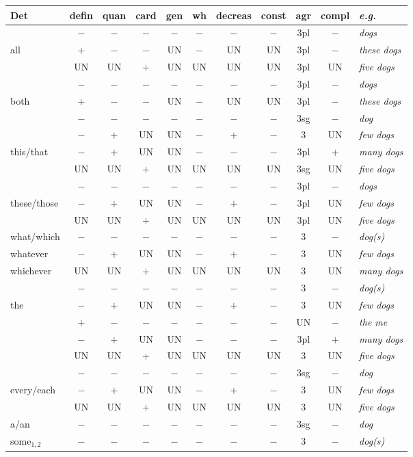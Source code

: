 \begin{table} 
\centering 
\begin{tabular}{|l||c|c|c|c|c|c|c|c|c||l|} 
\hline 
Det&defin&quan&card&gen&wh&decreas&const&agr&compl&{\it e.g.}\\ 
\hline 
\hline 
&$-$&$-$&$-$&$-$&$-$&$-$&$-$&3pl&$-$&{\it dogs}\\ 
all&$+$&$-$&$-$&UN&$-$&UN&UN&3pl&$-$&{\it these dogs}\\ 
&UN&UN&$+$&UN&UN&UN&UN&3pl&UN&{\it five dogs}\\ 
\hline 
&$-$&$-$&$-$&$-$&$-$&$-$&$-$&3pl&$-$&{\it dogs}\\ 
{both}&$+$&$-$&$-$&UN&$-$&UN&UN&3pl&$-$&{\it these dogs}\\ 
\hline 
&$-$&$-$&$-$&$-$&$-$&$-$&$-$&3sg&$-$&{\it dog}\\ 
&$-$&$+$&UN&UN&$-$&$+$&$-$&3&UN&{\it few dogs}\\ 
{this/that}&$-$&$+$&UN&UN&$-$&$-$&$-$&3pl&$+$&{\it many dogs}\\ 
&UN&UN&$+$&UN&UN&UN&UN&3sg&UN&{\it five dogs}\\ 
\hline 
&$-$&$-$&$-$&$-$&$-$&$-$&$-$&3pl&$-$&{\it dogs}\\ 
these/those&$-$&$+$&UN&UN&$-$&$+$&$-$&3pl&UN&{\it few dogs}\\ 
&UN&UN&$+$&UN&UN&UN&UN&3pl&UN&{\it five dogs}\\ 
\hline 
what/which&$-$&$-$&$-$&$-$&$-$&$-$&$-$&3&$-$&{\it dog(s)}\\ 
whatever&$-$&$+$&UN&UN&$-$&$+$&$-$&3&UN&{\it few dogs}\\ 
whichever&UN&UN&$+$&UN&UN&UN&UN&3&UN&{\it many dogs}\\ 
\hline 
&$-$&$-$&$-$&$-$&$-$&$-$&$-$&3&$-$&{\it dog(s)}\\ 
the&$-$&$+$&UN&UN&$-$&$+$&$-$&3&UN&{\it few dogs}\\ 
&$+$&$-$&$-$&$-$&$-$&$-$&$-$&UN&$-$&{\it the me}\\ 
&$-$&$+$&UN&UN&$-$&$-$&$-$&3pl&$+$&{\it many dogs}\\ 
&UN&UN&$+$&UN&UN&UN&UN&3&UN&{\it five dogs}\\ 
\hline 
&$-$&$-$&$-$&$-$&$-$&$-$&$-$&3sg&$-$&{\it dog}\\ 
every/each&$-$&$+$&UN&UN&$-$&$+$&$-$&3&UN&{\it few dogs}\\ 
&UN&UN&$+$&UN&UN&UN&UN&3&UN&{\it five dogs}\\ 
\hline 
a/an&$-$&$-$&$-$&$-$&$-$&$-$&$-$&3sg&$-$&{\it dog}\\ 
\hline 
some$_{1,2}$&$-$&$-$&$-$&$-$&$-$&$-$&$-$&3&$-$&{\it dog(s)}\\ 

\end{tabular}
\end{table}
